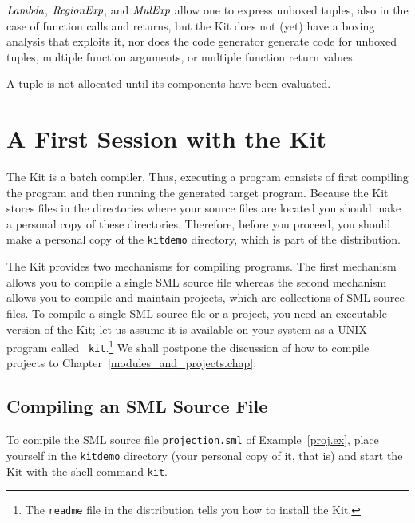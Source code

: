 \documentclass[12pt]{book}
\begin{document}
$\hbox{\it Lambda}$, $\hbox{\it RegionExp}$, and $\hbox{\it MulExp}$ allow one to express unboxed tuples, 
also in the case of function calls and returns, but the Kit does not 
(yet) have a boxing analysis that exploits it, nor does the 
code generator generate code for unboxed tuples, multiple function arguments,
or multiple function return values.

A tuple is not allocated until its components have been evaluated.

\section{A First Session with the Kit}
\label{tryit.sec}
The Kit is a batch compiler. Thus, executing a
program consists of first compiling the program and then running the
generated target program. Because the Kit stores files in the
directories where your source files are located you should make a
personal copy of these directories. Therefore, before you proceed, you
should make a personal copy of the {\tt kitdemo} directory, which is
part of the distribution.

The Kit provides two mechanisms for compiling programs. The first
mechanism allows you to compile a single SML source file whereas the
second mechanism allows you to compile and maintain projects, which
are collections of SML source files. To compile a single SML source
file or a project, you need an executable version of the Kit; let us
assume it is available on your system as a UNIX program called {\tt
  kit}.\footnote{The {\tt readme} file in the distribution tells you
  how to install the Kit.}  We shall postpone the discussion of how to
compile projects to Chapter~\ref{modules_and_projects.chap}.

\subsection{Compiling an SML Source File}
To compile the SML source file {\tt projection.sml} of
Example~\ref{proj.ex}, place yourself in the {\tt kitdemo} directory
(your personal copy of it, that is) and start the Kit with the shell
command {\tt kit}.
\end{document}
